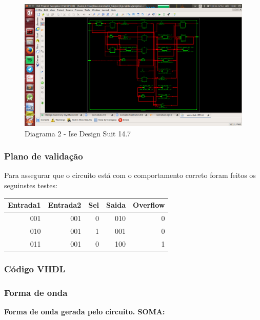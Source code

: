 \documentclass[12pts]{article}
\begin{document}
\begin{figure}[!htb]
  \centering
  \includegraphics[scale=0.3	]{imagens/somaSub2}
  \caption{Diagrama 2 - Ise Design Suit 14.7}
  \label{figRotulo}
\end{figure}


\subsubsection{Plano de validação}

Para assegurar que o circuito está com o comportamento correto foram feitos os seguinstes testes:

\begin{center}
	\begin{tabular}{|r|r|r|r|r|}
		\hline
		Entrada1 & Entrada2 & Sel & Saida & Overflow\\
		\hline
		001 & 001 & 0 & 010 & 0\\
		\hline
		010 & 001 & 1 & 001 & 0\\
		\hline
		011 & 001 & 0 & 100 & 1\\
		\hline
	\end{tabular}
\end{center}

\newpage
\subsubsection{Código VHDL}



\newpage
\subsubsection{Forma de onda}

\textbf{Forma de onda gerada pelo circuito. SOMA:}
\end{document}
